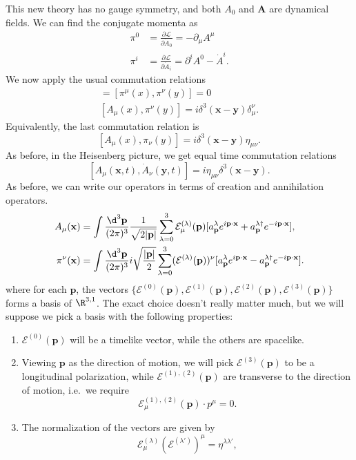 \documentclass[a4paper]{article}
\begin{document}
This new theory has no gauge symmetry, and both $A_0$ and $\mathbf{A}$ are dynamical fields. We can find the conjugate momenta as
\begin{align*}
  \pi^0 &= \frac{\partial\mathcal{L}}{\partial \dot{A}_0} = - \partial_\mu A^\mu\\
  \pi^i &= \frac{\partial \mathcal{L}}{\partial \dot{A}_i} = \partial^i A^0 - \dot{A}^i.
\end{align*}
We now apply the usual commutation relations
\begin{gather*}
  [A_\mu (x), A_\nu(y)] = [\pi^\mu(x), \pi^\nu(y)] = 0\\
  [A_\mu(x), \pi^\nu(y)] = i\delta^3(\mathbf{x} - \mathbf{y}) \delta_\mu^\nu.
\end{gather*}
Equivalently, the last commutation relation is
\[
  [A_\mu(x), \pi_\nu(y)] = i\delta^3(\mathbf{x} - \mathbf{y}) \eta_{\mu\nu}.
\]
As before, in the Heisenberg picture, we get equal time commutation relations
\[
  [A_\mu (\mathbf{x}, t), \dot{A}_\nu(\mathbf{y}, t)] = i\eta_{\mu\nu} \delta^3(\mathbf{x} - \mathbf{y}).
\]
As before, we can write our operators in terms of creation and annihilation operators.
\begin{align*}
  A_\mu(\mathbf{x}) &= \int \frac{\d^3 \mathbf{p}}{(2\pi)^3} \frac{1}{\sqrt{2 |\mathbf{p}|}} \sum_{\lambda = 0}^3 \mathcal{E}_\mu^{(\lambda)}(\mathbf{p}) [a_\mathbf{p}^\lambda e^{i\mathbf{p}\cdot \mathbf{x}} + a_\mathbf{p}^{\lambda\dagger} e^{-i\mathbf{p}\cdot \mathbf{x}}],\\
  \pi^\nu(\mathbf{x}) &= \int \frac{\d^3 \mathbf{p}}{(2\pi)^3} i\sqrt{\frac{|\mathbf{p}|}{2}} \sum_{\lambda = 0}^3 (\mathcal{E}^{(\lambda)}(\mathbf{p}))^\nu [a_\mathbf{p}^\lambda e^{i\mathbf{p}\cdot \mathbf{x}} - a_\mathbf{p}^{\lambda\dagger} e^{-i\mathbf{p}\cdot \mathbf{x}}].
\end{align*}
where for each $\mathbf{p}$, the vectors $\{\mathcal{E}^{(0)}(\mathbf{p}), \mathcal{E}^{(1)}(\mathbf{p}), \mathcal{E}^{(2)}(\mathbf{p}), \mathcal{E}^{(3)}(\mathbf{p})\}$ forms a basis of $\R^{3, 1}$. The exact choice doesn't really matter much, but we will suppose we pick a basis with the following properties:
\begin{enumerate}
  \item $\mathcal{E}^{(0)}(\mathbf{p})$ will be a timelike vector, while the others are spacelike.
  \item Viewing $\mathbf{p}$ as the direction of motion, we will pick $\mathcal{E}^{(3)}(\mathbf{p})$ to be a longitudinal polarization, while $\mathcal{E}^{(1),(2)}(\mathbf{p})$ are transverse to the direction of motion, i.e.\ we require
    \[
      \mathcal{E}^{(1), (2)}_\mu(\mathbf{p}) \cdot p^\mu = 0.
    \]
  \item The normalization of the vectors are given by
    \[
      \mathcal{E}^{(\lambda)}_\mu (\mathcal{E}^{(\lambda')})^\mu = \eta^{\lambda\lambda'},
    \]
\end{enumerate}
\end{document}
